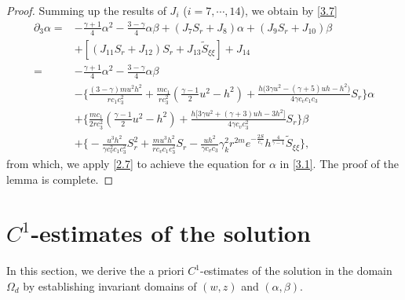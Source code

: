 \documentclass[11pt,reqno]{article}
\numberwithin{equation}{section}
\begin{document}
\begin{proof}
Summing up the results of $J_{i}$ ($i=7,\cdots,14$), we obtain by \eqref{3.7}
\begin{align*}
\partial_3 \alpha =&-\frac{\gamma+1}{4}\alpha^{2}
- \frac{3-\gamma}{4}\alpha\beta +(J_7 S_{r} +J_8)\alpha +(J_9 S_r +J_{10})\beta \\
&+[(J_{11}S_{r}  +J_{12})S_r +J_{13}\widetilde{S}_{\xi\xi}]  +J_{14} \\
=&-\frac{\gamma+1}{4}\alpha^{2}
- \frac{3-\gamma}{4}\alpha\beta \\
&-\bigg\{\frac{(3-\gamma) m u^2 h^2}{r c_1 c_3^2}+ \frac{m c_1}{r c_3^2}\left( \frac{\gamma-1}{2}u^{2} - h^{2} \right)
 + \frac{h\big(3\gamma u^2 - (\gamma+5)u h - h^2\big)}{4\gamma c_v c_1 c_3} S_r\bigg\}\alpha \\
& +\bigg\{\frac{mc_1}{2r c_3^2} \left( \frac{\gamma-1}{2}u^{2} - h^{2} \right)
+ \frac{h\big[3\gamma u^2+(\gamma+3)u h-3h^2\big]}{4\gamma c_v c_3^2 } S_r\bigg\}\beta \\ &+\bigg\{-\frac{u^3 h^2}{\gamma c_v^2 c_1 c_3^2}S_r^2
+ \frac{mu^3 h^2}{r c_v c_1 c_3^2} S_r
- \frac{u h^2}{\gamma c_v c_3}\gamma_k^2 r^{2m} e^{-\frac{2S}{c_\gamma}} h^{\frac{4}{\gamma-1}} \widetilde{S}_{\xi\xi}\bigg\},
\end{align*}
from which, we apply \eqref{2.7} to achieve the equation for $\alpha$ in \eqref{3.1}. The proof of the lemma is complete.
\end{proof}



\section{$C^1$-estimates of the solution}\label{S4}

In this section, we derive the a priori $C^1$-estimates of the solution in the domain $\Omega_{d}$ by establishing invariant domains of $(w,z)$ and $(\alpha,\beta)$.
\end{document}
